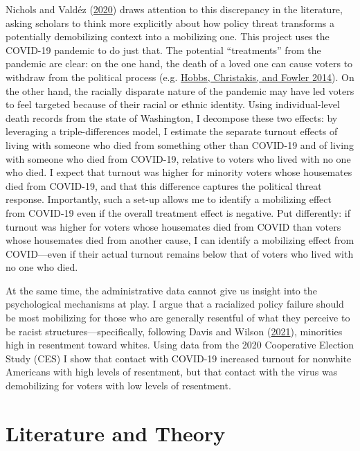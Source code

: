 \documentclass[
  12pt,
]{article}
\begin{document}
Nichols and Valdéz (\protect\hyperlink{ref-Nichols2020a}{2020}) draws attention to this discrepancy in the literature, asking scholars to think more explicitly about how policy threat transforms a potentially demobilizing context into a mobilizing one. This project uses the COVID-19 pandemic to do just that. The potential ``treatments'' from the pandemic are clear: on the one hand, the death of a loved one can cause voters to withdraw from the political process (e.g. \protect\hyperlink{ref-Hobbs2014}{Hobbs, Christakis, and Fowler 2014}). On the other hand, the racially disparate nature of the pandemic may have led voters to feel targeted because of their racial or ethnic identity. Using individual-level death records from the state of Washington, I decompose these two effects: by leveraging a triple-differences model, I estimate the separate turnout effects of living with someone who died
from something other than COVID-19 and of living with someone who died from COVID-19, relative to voters who lived with no one who died. I expect that turnout was higher for minority voters whose housemates died from COVID-19, and that this difference captures the political threat response. Importantly, such a set-up allows me to identify a mobilizing effect from COVID-19 even if the overall treatment effect is negative. Put differently: if turnout was higher for voters whose housemates died from COVID than voters whose housemates died from another cause, I can identify a mobilizing effect from COVID---even if their actual turnout remains below that of voters who lived with no one who died.

At the same time, the administrative data cannot give us insight into the psychological mechanisms at play. I argue that a racialized policy failure should be most mobilizing for those who are generally resentful of what they perceive to be racist structures---specifically, following Davis and Wilson (\protect\hyperlink{ref-Davis2021}{2021}), minorities high in resentment toward whites. Using data from the 2020 Cooperative Election Study (CES) I show that contact with COVID-19 increased turnout for nonwhite Americans with high levels of resentment, but that contact with the virus was demobilizing for voters with low levels of resentment.

\hypertarget{literature-and-theory}{%
\section*{Literature and Theory}\label{literature-and-theory}}
\end{document}

